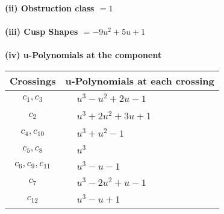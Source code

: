 \documentclass[1p]{elsarticle_modified}
\theoremstyle{definition}
\begin{document}
\flushleft \textbf{(ii) Obstruction class $= 1$}\\~\\
\flushleft \textbf{(iii) Cusp Shapes $= -9 u^2+5 u+1$}\\~\\
\newpage\renewcommand{\arraystretch}{1}
\flushleft \textbf{(iv) u-Polynomials at the component}\newline \\
\begin{tabular}{m{50pt}|m{274pt}}
Crossings & \hspace{64pt}u-Polynomials at each crossing \\
\hline $$\begin{aligned}c_{1},c_{3}\end{aligned}$$&$\begin{aligned}
&u^3- u^2+2 u-1
\end{aligned}$\\
\hline $$\begin{aligned}c_{2}\end{aligned}$$&$\begin{aligned}
&u^3+2 u^2+3 u+1
\end{aligned}$\\
\hline $$\begin{aligned}c_{4},c_{10}\end{aligned}$$&$\begin{aligned}
&u^3+u^2-1
\end{aligned}$\\
\hline $$\begin{aligned}c_{5},c_{8}\end{aligned}$$&$\begin{aligned}
&u^3
\end{aligned}$\\
\hline $$\begin{aligned}c_{6},c_{9},c_{11}\end{aligned}$$&$\begin{aligned}
&u^3- u-1
\end{aligned}$\\
\hline $$\begin{aligned}c_{7}\end{aligned}$$&$\begin{aligned}
&u^3-2 u^2+u-1
\end{aligned}$\\
\hline $$\begin{aligned}c_{12}\end{aligned}$$&$\begin{aligned}
&u^3- u+1
\end{aligned}$\\
\hline
\end{tabular}\\~\\
\end{document}

